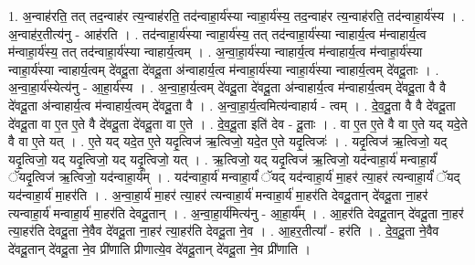 \documentclass[17pt]{extarticle}
\begin{document}
1. अ॒न्वाह॑रति॒ तत् तद॒न्वाह॑र त्य॒न्वाह॑रति॒ तद॑न्वाहा॒र्य॑स्या न्वाहा॒र्य॑स्य॒ तद॒न्वाह॑र त्य॒न्वाह॑रति॒ तद॑न्वाहा॒र्य॑स्य । . अ॒न्वाह॑र॒तीत्य॑नु - आह॑रति । . तद॑न्वाहा॒र्य॑स्या न्वाहा॒र्य॑स्य॒ तत् तद॑न्वाहा॒र्य॑स्या न्वाहार्य॒त्व म॑न्वाहार्य॒त्व म॑न्वाहा॒र्य॑स्य॒ तत् तद॑न्वाहा॒र्य॑स्या न्वाहार्य॒त्वम् । . अ॒न्वा॒हा॒र्य॑स्या न्वाहार्य॒त्व म॑न्वाहार्य॒त्व म॑न्वाहा॒र्य॑स्या न्वाहा॒र्य॑स्या न्वाहार्य॒त्वम् दे॑वदू॒ता दे॑वदू॒ता अ॑न्वाहार्य॒त्व म॑न्वाहा॒र्य॑स्या न्वाहा॒र्य॑स्या न्वाहार्य॒त्वम् दे॑वदू॒ताः । . अ॒न्वा॒हा॒र्य॑स्येत्य॑नु - आ॒हा॒र्य॑स्य । . अ॒न्वा॒हा॒र्य॒त्वम् दे॑वदू॒ता दे॑वदू॒ता अ॑न्वाहार्य॒त्व म॑न्वाहार्य॒त्वम् दे॑वदू॒ता वै वै दे॑वदू॒ता अ॑न्वाहार्य॒त्व म॑न्वाहार्य॒त्वम् दे॑वदू॒ता वै । . अ॒न्वा॒हा॒र्य॒त्वमित्य॑न्वाहार्य - त्वम् । . दे॒व॒दू॒ता वै वै दे॑वदू॒ता दे॑वदू॒ता वा ए॒त ए॒ते वै दे॑वदू॒ता दे॑वदू॒ता वा ए॒ते । . दे॒व॒दू॒ता इति॑ देव - दू॒ताः । . वा ए॒त ए॒ते वै वा ए॒ते यद् यदे॒ते वै वा ए॒ते यत् । . ए॒ते यद् यदे॒त ए॒ते यदृ॒त्विज॑ ऋ॒त्विजो॒ यदे॒त ए॒ते यदृ॒त्विजः॑ । . यदृ॒त्विज॑ ऋ॒त्विजो॒ यद् यदृ॒त्विजो॒ यद् यदृ॒त्विजो॒ यद् यदृ॒त्विजो॒ यत् । . ऋ॒त्विजो॒ यद् यदृ॒त्विज॑ ऋ॒त्विजो॒ यद॑न्वाहा॒र्य॑ मन्वाहा॒र्यं॑ ॅयदृ॒त्विज॑ ऋ॒त्विजो॒ यद॑न्वाहा॒र्य᳚म् । . यद॑न्वाहा॒र्य॑ मन्वाहा॒र्यं॑ ॅयद् यद॑न्वाहा॒र्य॑ मा॒हर॑ त्या॒हर॑ त्यन्वाहा॒र्यं॑ ॅयद् यद॑न्वाहा॒र्य॑ मा॒हर॑ति । . अ॒न्वा॒हा॒र्य॑ मा॒हर॑ त्या॒हर॑ त्यन्वाहा॒र्य॑ मन्वाहा॒र्य॑ मा॒हर॑ति देवदू॒तान् दे॑वदू॒ता ना॒हर॑ त्यन्वाहा॒र्य॑ मन्वाहा॒र्य॑ मा॒हर॑ति देवदू॒तान् । . अ॒न्वा॒हा॒र्य॑मित्य॑नु - आ॒हा॒र्य᳚म् । . आ॒हर॑ति देवदू॒तान् दे॑वदू॒ता ना॒हर॑ त्या॒हर॑ति देवदू॒ता ने॒वैव दे॑वदू॒ता ना॒हर॑ त्या॒हर॑ति देवदू॒ता ने॒व । . आ॒हर॒तीत्या᳚ - हर॑ति । . दे॒व॒दू॒ता ने॒वैव दे॑वदू॒तान् दे॑वदू॒ता ने॒व प्री॑णाति प्रीणात्ये॒व दे॑वदू॒तान् दे॑वदू॒ता ने॒व प्री॑णाति । \newline
\end{document}
